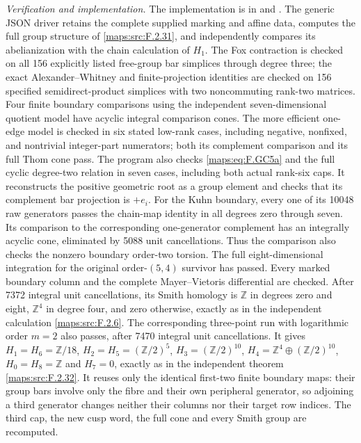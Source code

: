 \emph{Verification and implementation.}
The implementation is in 
and .
The generic JSON driver 
retains the complete supplied marking and affine data, computes
the full group structure of \ref{maps:src:F.2.31}, and independently compares
its abelianization with the chain calculation of $H_1$.
The Fox contraction is checked on all 156 explicitly listed
free-group bar simplices through degree three; the exact
Alexander--Whitney and finite-projection identities are
checked on 156 specified semidirect-product simplices with
two noncommuting rank-two matrices.
Four finite boundary comparisons using the independent
seven-dimensional quotient model have acyclic integral
comparison cones.  The more efficient one-edge model is
checked in six stated low-rank cases, including negative,
nonfixed, and nontrivial integer-part numerators; both its
complement comparison and its full Thom cone pass.
The program  also
checks \eqref{maps:eq:F.GC5a} and the full cyclic degree-two relation in
seven cases, including both actual rank-six caps.  It
reconstructs the positive geometric root as a group element
and checks that its complement bar projection is $+e_i$.
For the Kuhn boundary, every one of its 10048 raw generators
passes the chain-map identity in all degrees zero through
seven.  Its comparison to the corresponding one-generator
complement has an integrally acyclic cone, eliminated by
5088 unit cancellations.  Thus the comparison also checks
the nonzero boundary order-two torsion.
The full eight-dimensional integration for the original
order-$(5,4)$ survivor has passed.  Every marked boundary
column and the complete Mayer--Vietoris differential are
checked.  After 7372 integral unit cancellations, its Smith
homology is $\mathbb Z$ in degrees zero and eight,
$\mathbb Z^4$ in degree four, and zero otherwise, exactly
as in the independent calculation \ref{maps:src:F.2.6}.
The corresponding three-point run with logarithmic order
$m=2$ also passes, after 7470 integral unit cancellations.
It gives $H_1=H_6=\mathbb Z/18$,
$H_2=H_5=(\mathbb Z/2)^5$, $H_3=(\mathbb Z/2)^{10}$,
$H_4=\mathbb Z^4\oplus(\mathbb Z/2)^{10}$,
$H_0=H_8=\mathbb Z$ and $H_7=0$, exactly as in the
independent theorem \ref{maps:src:F.2.32}.  It reuses only the identical
first-two finite boundary maps: their group bars involve only
the fibre and their own peripheral generator, so adjoining
a third generator changes neither their columns nor their
target row indices.  The third cap, the new cusp word,
the full cone and every Smith group are recomputed.

